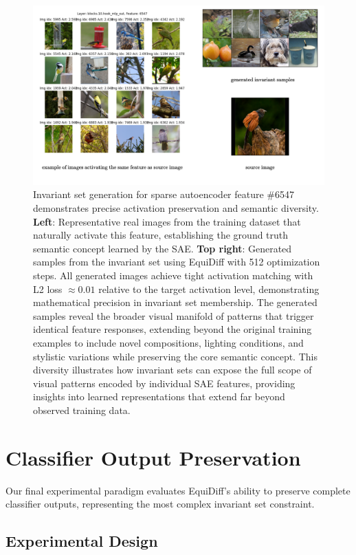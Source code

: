 \documentclass[licencjacka,en]{pracamgr}
\newcommand{\method}[1]{EquiDiff}  %
\begin{document}
\begin{figure}[h]
\centering
\includegraphics[width=\linewidth]{figures/main/experiment1.2.pdf}
\caption{Invariant set generation for sparse autoencoder feature \#6547 demonstrates precise activation preservation and semantic diversity. \textbf{Left}: Representative real images from the training dataset that naturally activate this feature, establishing the ground truth semantic concept learned by the SAE. \textbf{Top right}: Generated samples from the invariant set using \method{} with 512 optimization steps. All generated images achieve tight activation matching with L2 loss $\approx 0.01$ relative to the target activation level, demonstrating mathematical precision in invariant set membership. The generated samples reveal the broader visual manifold of patterns that trigger identical feature responses, extending beyond the original training examples to include novel compositions, lighting conditions, and stylistic variations while preserving the core semantic concept. This diversity illustrates how invariant sets can expose the full scope of visual patterns encoded by individual SAE features, providing insights into learned representations that extend far beyond observed training data.}
\label{fig:experiment_1_2}
\end{figure}

\section{Classifier Output Preservation}

Our final experimental paradigm evaluates \method{}'s ability to preserve complete classifier outputs, representing the most complex invariant set constraint.

\subsection{Experimental Design}
\end{document}
